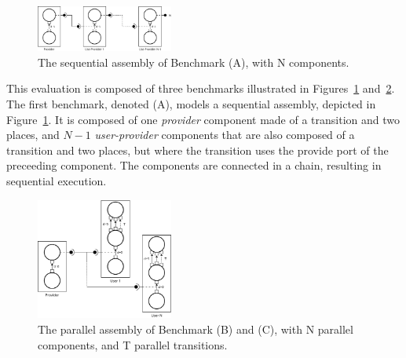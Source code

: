 
\begin{figure}[h]
  \begin{center}
    \includegraphics[width=0.4\textwidth]{./images/seq.pdf}
    \caption{The \mad sequential assembly of Benchmark (A), with N components.}
    \label{fig:seq}
  \end{center}
\end{figure}

This evaluation is composed of three benchmarks illustrated in
Figures~\ref{fig:seq} and~\ref{fig:par}.
The first benchmark, denoted (A), models a sequential \mad assembly,
depicted in Figure~\ref{fig:seq}. It is composed of one
\emph{provider} component made of a transition and two places, and
$N-1$ \emph{user-provider} components that are also composed of a
transition and two places, but where the transition uses the provide
port of the preceeding component. The components are connected in
a chain, resulting in sequential execution.

\begin{figure}[h]
  \begin{center}
    \includegraphics[width=0.4\textwidth]{./images/par.pdf}
    \caption{The \mad parallel assembly of Benchmark (B) and (C), with N parallel components, and T parallel transitions.}
    \label{fig:par}
  \end{center}
\end{figure}

